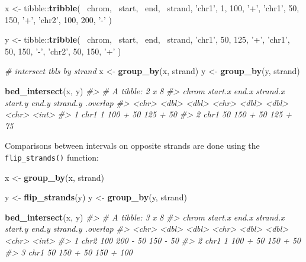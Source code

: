 \documentclass[9pt,a4paper]{extarticle}
\renewcommand{\KeywordTok}[1]{\textbf{{#1}}}
\renewcommand{\DecValTok}[1]{\textcolor[rgb]{0.00,0.00,1.00}{{#1}}}
\renewcommand{\StringTok}[1]{\textcolor[rgb]{0.87,0.00,0.00}{{#1}}}
\renewcommand{\CommentTok}[1]{\textcolor[rgb]{0.50,0.50,0.50}{\textit{{#1}}}}
\renewcommand{\NormalTok}[1]{{#1}}
\begin{document}
\begin{Highlighting}[]
\NormalTok{x <-}\StringTok{ }\NormalTok{tibble::}\KeywordTok{tribble}\NormalTok{(}
  \NormalTok{~chrom, ~start, ~end, ~strand,}
  \StringTok{'chr1'}\NormalTok{, }\DecValTok{1}\NormalTok{,      }\DecValTok{100}\NormalTok{,  }\StringTok{'+'}\NormalTok{,}
  \StringTok{'chr1'}\NormalTok{, }\DecValTok{50}\NormalTok{,     }\DecValTok{150}\NormalTok{,  }\StringTok{'+'}\NormalTok{,}
  \StringTok{'chr2'}\NormalTok{, }\DecValTok{100}\NormalTok{,    }\DecValTok{200}\NormalTok{,  }\StringTok{'-'}
\NormalTok{)}

\NormalTok{y <-}\StringTok{ }\NormalTok{tibble::}\KeywordTok{tribble}\NormalTok{(}
  \NormalTok{~chrom, ~start, ~end, ~strand,}
  \StringTok{'chr1'}\NormalTok{, }\DecValTok{50}\NormalTok{,     }\DecValTok{125}\NormalTok{,  }\StringTok{'+'}\NormalTok{,}
  \StringTok{'chr1'}\NormalTok{, }\DecValTok{50}\NormalTok{,     }\DecValTok{150}\NormalTok{,  }\StringTok{'-'}\NormalTok{,}
  \StringTok{'chr2'}\NormalTok{, }\DecValTok{50}\NormalTok{,     }\DecValTok{150}\NormalTok{,  }\StringTok{'+'}
\NormalTok{)}

\CommentTok{# intersect tbls by strand}
\NormalTok{x <-}\StringTok{ }\KeywordTok{group_by}\NormalTok{(x, strand)}
\NormalTok{y <-}\StringTok{ }\KeywordTok{group_by}\NormalTok{(y, strand)}

\KeywordTok{bed_intersect}\NormalTok{(x, y)}
\CommentTok{#> # A tibble: 2 x 8}
\CommentTok{#>   chrom start.x end.x strand.x start.y end.y strand.y .overlap}
\CommentTok{#>   <chr>   <dbl> <dbl>    <chr>   <dbl> <dbl>    <chr>    <int>}
\CommentTok{#> 1  chr1       1   100        +      50   125        +       50}
\CommentTok{#> 2  chr1      50   150        +      50   125        +       75}
\end{Highlighting}

Comparisons between intervals on opposite strands are done using the
\texttt{flip\_strands()} function:

\begin{Highlighting}[]
\NormalTok{x <-}\StringTok{ }\KeywordTok{group_by}\NormalTok{(x, strand)}

\NormalTok{y <-}\StringTok{ }\KeywordTok{flip_strands}\NormalTok{(y)}
\NormalTok{y <-}\StringTok{ }\KeywordTok{group_by}\NormalTok{(y, strand)}

\KeywordTok{bed_intersect}\NormalTok{(x, y)}
\CommentTok{#> # A tibble: 3 x 8}
\CommentTok{#>   chrom start.x end.x strand.x start.y end.y strand.y .overlap}
\CommentTok{#>   <chr>   <dbl> <dbl>    <chr>   <dbl> <dbl>    <chr>    <int>}
\CommentTok{#> 1  chr2     100   200        -      50   150        -       50}
\CommentTok{#> 2  chr1       1   100        +      50   150        +       50}
\CommentTok{#> 3  chr1      50   150        +      50   150        +      100}
\end{Highlighting}
\end{document}
